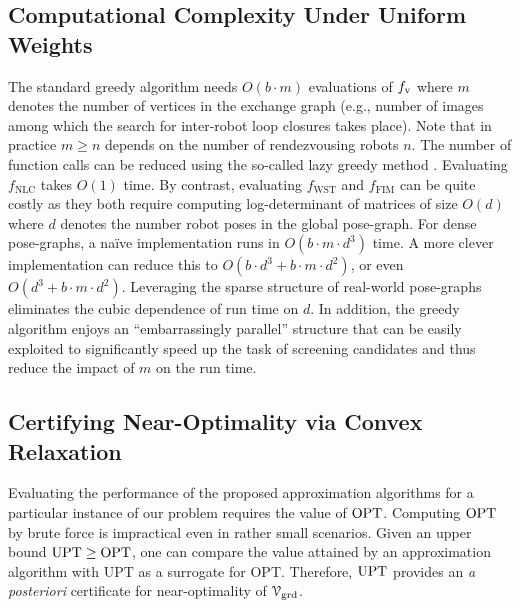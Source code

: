 \documentclass[conference]{IEEEtran}
\begin{document}
\subsection{Computational Complexity Under Uniform Weights}
\label{subsec:complexity}
The standard greedy algorithm needs $O(b\cdot m)$ evaluations of
$f_\text{v}$ where $m$ denotes the number of vertices in the
exchange graph (e.g., number of images among which the search for inter-robot loop
closures takes place). Note that in practice $m \geq n$ depends on the number of
rendezvousing robots $n$. The number of function calls can be reduced using the
so-called lazy greedy method \cite{minoux1978accelerated,krauseSurvey}. Evaluating $f_\text{NLC}$
takes $O(1)$ time. By contrast, evaluating $f_\text{WST}$ and $f_\text{FIM}$
can be quite costly as they both require computing log-determinant of matrices of size $O(d)$ where
$d$ denotes the number robot poses in the global pose-graph. For dense
pose-graphs, a na\"{i}ve implementation runs in $O(b\cdot
m\cdot d^3)$ time. A more clever implementation
\cite{kasra16wafr,kasra18ijrr} can reduce
this to $O(b \cdot d^3 + b \cdot m \cdot d^2)$, or even $O(d^3 + b \cdot
m \cdot d^2)$. Leveraging the sparse structure
of real-world pose-graphs eliminates the cubic dependence of run time on $d$.
In addition, the greedy algorithm enjoys an ``embarrassingly parallel'' structure
that can be easily exploited to
significantly speed up the task of screening candidates and thus reduce the
impact of $m$ on the run time.


\subsection{Certifying Near-Optimality via Convex Relaxation}
\label{subsec:cvx}
Evaluating the performance of the proposed approximation algorithms for a
particular instance of our problem requires
the value of $\mathrm{OPT}$.
Computing $\mathrm{OPT}$
by brute force is impractical even in rather small scenarios. Given
an upper bound 
$\mathrm{UPT} \geq \mathrm{OPT}$, one can compare the
value attained by an approximation algorithm with $\mathrm{UPT}$
as a surrogate for $\mathrm{OPT}$. Therefore, $\mathrm{UPT}$ provides an \emph{a posteriori} certificate for 
near-optimality of $\mathcal{V}_\text{grd}$.
\end{document}
